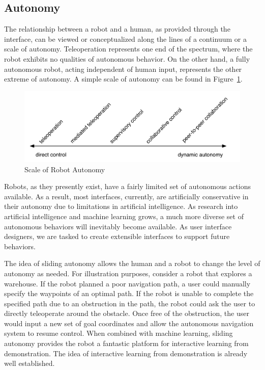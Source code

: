 \subsection{Autonomy}

The relationship between a robot and a human, as provided through the interface, can be viewed or conceptualized along the lines of a continuum or a scale of autonomy. Teleoperation represents one end of the spectrum, where the robot exhibits no qualities of autonomous behavior. On the other hand, a fully autonomous robot, acting independent of human input, represents the other extreme of autonomy. A simple scale of autonomy can be found in Figure~\ref{fig:autonomy}. \cite{Goodrich_Survey}


\begin{figure}[ht]
\begin{center}
\includegraphics[width=5in]{images/autonomy.pdf}
\caption{Scale of Robot Autonomy\label{fig:autonomy}}
\end{center}
\end{figure}

Robots, as they presently exist, have a fairly limited set of autonomous actions available. As a result, most interfaces, currently, are artificially conservative in their autonomy due to limitations in artificial intelligence. As research into artificial intelligence and machine learning grows, a much more diverse set of autonomous behaviors will inevitably become available. As user interface designers, we are tasked to create extensible interfaces to support future behaviors.

The idea of sliding autonomy allows the human and a robot to change the level of autonomy as needed. For illustration purposes, consider a robot that explores a warehouse. If the robot planned a poor navigation path, a user could manually specify the waypoints of an optimal path. If the robot is unable to complete the specified path due to an obstruction in the path, the robot could ask the user to directly teleoperate around the obstacle. Once free of the obstruction, the user would input a new set of goal coordinates and allow the autonomous navigation system to resume control. When combined with machine learning, sliding autonomy provides the robot a fantastic platform for interactive learning from demonstration. The idea of interactive learning from demonstration is already well established. \cite{GWAP} \cite{Grollman}

